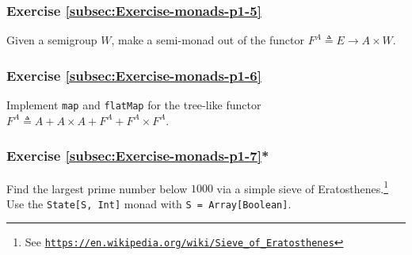 \subsubsection{Exercise \label{subsec:Exercise-monads-p1-5}\ref{subsec:Exercise-monads-p1-5}}

Given a semigroup $W$, make a semi-monad out of the functor $F^{A}\triangleq E\rightarrow A\times W$.

\subsubsection{Exercise \label{subsec:Exercise-monads-p1-6}\ref{subsec:Exercise-monads-p1-6}}

Implement \lstinline!map! and \lstinline!flatMap! for the tree-like
functor $F^{A}\triangleq A+A\times A+F^{A}+F^{A}\times F^{A}$.

\subsubsection{Exercise \label{subsec:Exercise-monads-p1-7}\ref{subsec:Exercise-monads-p1-7}{*}}

Find the largest prime number below $1000$ via a simple sieve of
Eratosthenes.\footnote{See \texttt{\href{https://en.wikipedia.org/wiki/Sieve_of_Eratosthenes}{https://en.wikipedia.org/wiki/Sieve\_of\_Eratosthenes}}}
Use the \lstinline!State[S, Int]! monad with \lstinline!S = Array[Boolean]!.

